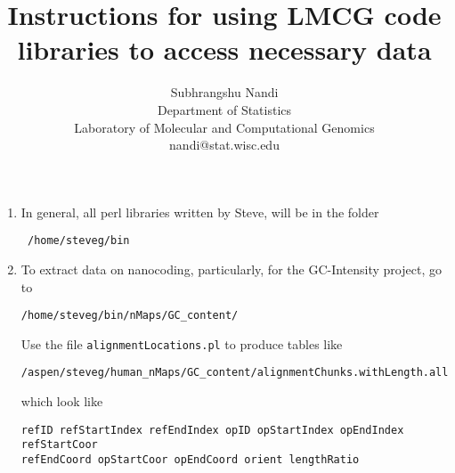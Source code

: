\documentclass[11pt]{article}
\begin{document}
\title{Instructions for using LMCG code libraries to access necessary data}
\author{Subhrangshu Nandi\\
  Department of Statistics\\
  Laboratory of Molecular and Computational Genomics\\
  nandi@stat.wisc.edu}
\maketitle

\begin{enumerate}
\item
In general, all perl libraries written by Steve, will be in the folder \begin{verbatim} /home/steveg/bin \end{verbatim}
\item
To extract data on nanocoding, particularly, for the GC-Intensity project, go to 
\begin{verbatim} 
/home/steveg/bin/nMaps/GC_content/ 
\end{verbatim} 
Use the file \texttt{alignmentLocations.pl} to produce tables like 
\begin{verbatim} 
/aspen/steveg/human_nMaps/GC_content/alignmentChunks.withLength.all7134Groups.goldOnly 
\end{verbatim} 
which look like
\begin{verbatim}
refID refStartIndex refEndIndex opID opStartIndex opEndIndex refStartCoor 
refEndCoord opStartCoor opEndCoord orient lengthRatio


\end{verbatim}
\end{enumerate}
\end{document}
